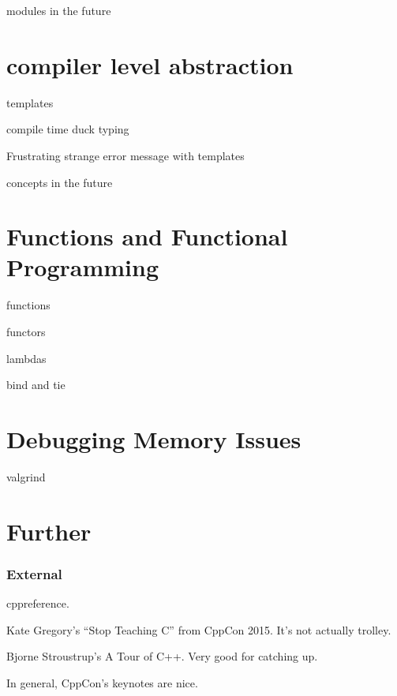 \documentclass[aspectratio=169]{beamer}
\begin{document}
\begin{frame}
  modules in the future
\end{frame}


\section{compiler level abstraction}

\begin{frame}
  templates
\end{frame}

\begin{frame}
  compile time duck typing
\end{frame}

\begin{frame}
  Frustrating strange error message with templates
\end{frame}

\begin{frame}
  concepts in the future
\end{frame}


\section{Functions and Functional Programming}

\begin{frame}
  functions
\end{frame}

\begin{frame}
  functors
\end{frame}

\begin{frame}
  lambdas
\end{frame}

\begin{frame}
  bind and tie
\end{frame}

\section{Debugging Memory Issues}


\begin{frame}
  valgrind
\end{frame}

\section{Further}

\begin{frame}
  \frametitle{External}

  \tiny

  cppreference. 

  Kate Gregory's ``Stop Teaching C'' from CppCon 2015.  It's not
  actually trolley.

  Bjorne Stroustrup's A Tour of C++. Very good for catching up.

  In general, CppCon's keynotes are nice.

\end{frame}
\end{document}
